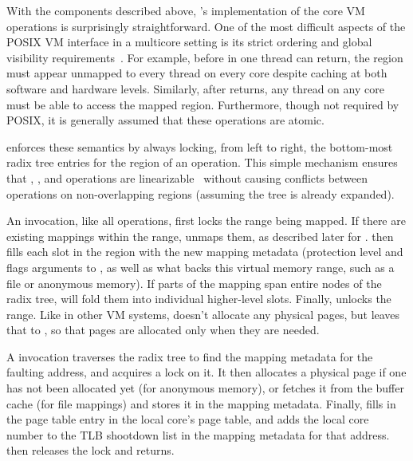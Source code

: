 With the components described above, \vm's implementation of the core
VM operations is surprisingly straightforward.
%
One of the most difficult aspects of the POSIX VM interface in a
multicore setting is its strict ordering and global visibility
requirements~\cite{clements:bonsai}.
%
For example, before  in one thread can return, the region
must appear unmapped to every thread on every core despite caching at
both software and hardware levels.
%
Similarly, after  returns, any thread on any core
must be able to access the mapped region.  Furthermore, though not
required by POSIX, it is generally assumed that these operations are
atomic.

\vm enforces these semantics by always locking, from left to right,
the bottom-most radix tree entries for the region of an operation.
%
This simple mechanism ensures that , , and
 operations are
linearizable~\cite{herlihy:linearizability} without causing conflicts
between operations on non-overlapping regions (assuming the tree is
already expanded).


An  invocation, like all \vm operations, first locks the
range being mapped.
%
If there are existing mappings within the
range,  unmaps them, as described later for .
 then fills each slot in the region with the new mapping
metadata (protection
level and flags arguments to , as well as what backs this virtual
memory range, such as a file or anonymous memory).
%
If parts of the mapping span entire nodes of the radix tree, \vm will
fold them into individual higher-level slots.
%
Finally, \vm unlocks the range.  Like in other VM systems,
doesn't allocate any physical pages, but leaves that to ,
so that pages are allocated only when they are needed.

A  invocation traverses the radix tree to find the
mapping metadata for the faulting address, and acquires a lock on it.
It then allocates a physical page if one has not been allocated yet
(for anonymous memory), or fetches it from the buffer cache (for file
mappings) and
stores it in the mapping metadata.  Finally,  fills in the
page table entry in the local core's page table, and adds the local core
number to the TLB shootdown list in the mapping metadata for that address.
 then releases the lock and returns.

